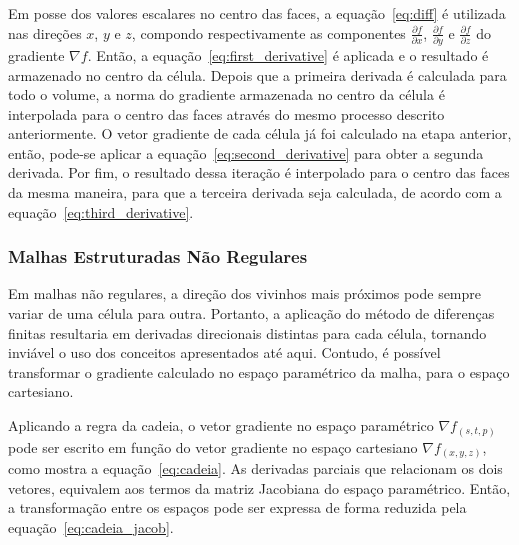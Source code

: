 	Em posse dos valores escalares no centro das faces, a equação~\eqref{eq:diff} é utilizada nas direções $ x $, $ y $ e $ z $, compondo respectivamente as componentes $ \frac{\partial f}{\partial x} $, $ \frac{\partial f}{\partial y} $ e $ \frac{\partial f}{\partial z} $ do gradiente $ \nabla f $. Então, a equação~\eqref{eq:first_derivative} é aplicada e o resultado é armazenado no centro da célula. Depois que a primeira derivada é calculada para todo o volume, a norma do gradiente armazenada no centro da célula é interpolada para o centro das faces através do mesmo processo descrito anteriormente. O vetor gradiente de cada célula já foi calculado na etapa anterior, então, pode-se aplicar a equação~\eqref{eq:second_derivative} para obter a segunda derivada. Por fim, o resultado dessa iteração é interpolado para o centro das faces da mesma maneira, para que a terceira derivada seja calculada, de acordo com a equação~\eqref{eq:third_derivative}.

\subsubsection{Malhas Estruturadas Não Regulares}
\label{subsec:my.nonstruct}
	Em malhas não regulares, a direção dos vivinhos mais próximos pode sempre variar de uma célula para outra. Portanto, a aplicação do método de diferenças finitas resultaria em derivadas direcionais distintas para cada célula, tornando inviável o uso dos conceitos apresentados até aqui. Contudo, é possível transformar o gradiente calculado no espaço paramétrico da malha, para o espaço cartesiano.
	
	Aplicando a regra da cadeia, o vetor gradiente no espaço paramétrico $ \nabla f_{(s, t, p)} $ pode ser escrito em função do vetor gradiente no espaço cartesiano $ \nabla f_{(x, y, z)} $, como mostra a equação~\eqref{eq:cadeia}. As derivadas parciais que relacionam os dois vetores, equivalem aos termos da matriz Jacobiana do espaço paramétrico. Então, a transformação entre os espaços pode ser expressa de forma reduzida pela equação~\eqref{eq:cadeia_jacob}.
	\\
	
